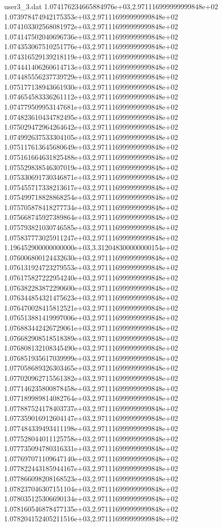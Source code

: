 \begin{filecontents}{user3_3.dat}
1.074176234665884976e+03,2.971116999999999848e+02
1.073978474942175353e+03,2.971116999999999848e+02
1.074103302568081972e+03,2.971116999999999848e+02
1.074147502040696736e+03,2.971116999999999848e+02
1.074353067510251776e+03,2.971116999999999848e+02
1.074316529139218119e+03,2.971116999999999848e+02
1.074441406260614713e+03,2.971116999999999848e+02
1.074485556237739729e+03,2.971116999999999848e+02
1.075177138943661930e+03,2.971116999999999848e+02
1.074654583336261112e+03,2.971116999999999848e+02
1.074779509953147681e+03,2.971116999999999848e+02
1.074823610434782495e+03,2.971116999999999848e+02
1.075029472964264642e+03,2.971116999999999848e+02
1.074992637533304105e+03,2.971116999999999848e+02
1.075117613645680649e+03,2.971116999999999848e+02
1.075161664631825488e+03,2.971116999999999848e+02
1.075529838546307019e+03,2.971116999999999848e+02
1.075330691730346871e+03,2.971116999999999848e+02
1.075455717338213617e+03,2.971116999999999848e+02
1.075499718828868254e+03,2.971116999999999848e+02
1.075705878418277734e+03,2.971116999999999848e+02
1.075668745927389864e+03,2.971116999999999848e+02
1.075793821030746585e+03,2.971116999999999848e+02
1.075837773025911247e+03,2.971116999999999848e+02
1.196452900000000000e+03,3.312048300000000154e+02
1.076006800124432630e+03,2.971116999999999848e+02
1.076131924723279553e+03,2.971116999999999848e+02
1.076175827222954240e+03,2.971116999999999848e+02
1.076382283872290600e+03,2.971116999999999848e+02
1.076344854321475623e+03,2.971116999999999848e+02
1.076470028415812521e+03,2.971116999999999848e+02
1.076513881419997006e+03,2.971116999999999848e+02
1.076883442426729061e+03,2.971116999999999848e+02
1.076682908518518389e+03,2.971116999999999848e+02
1.076808132108345490e+03,2.971116999999999848e+02
1.076851935617039999e+03,2.971116999999999848e+02
1.077058689326303465e+03,2.971116999999999848e+02
1.077020962715561382e+03,2.971116999999999848e+02
1.077146235800878458e+03,2.971116999999999848e+02
1.077189989814082764e+03,2.971116999999999848e+02
1.077887524178403737e+03,2.971116999999999848e+02
1.077359016912604147e+03,2.971116999999999848e+02
1.077484339493411198e+03,2.971116999999999848e+02
1.077528044011125758e+03,2.971116999999999848e+02
1.077735094780316331e+03,2.971116999999999848e+02
1.077697071109647140e+03,2.971116999999999848e+02
1.077822443185944167e+03,2.971116999999999848e+02
1.077866098208168523e+03,2.971116999999999848e+02
1.078237046307151104e+03,2.971116999999999848e+02
1.078035125306690134e+03,2.971116999999999848e+02
1.078160546878477135e+03,2.971116999999999848e+02
1.078204152405211516e+03,2.971116999999999848e+02

\end{filecontents}
